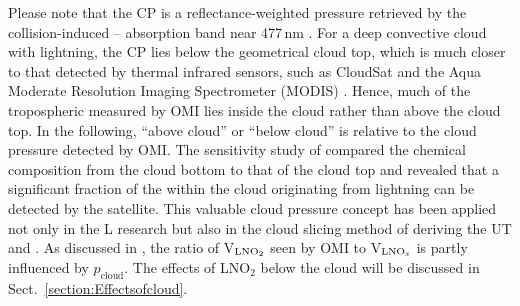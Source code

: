\documentclass[amt]{copernicus}
\begin{document}
Please note that the CP is a reflectance-weighted pressure retrieved by the collision-induced -- absorption band near 477\,nm \citep{Acarreta.2004,Sneep.2008,Stammes.2008}.
For a deep convective cloud with lightning, the CP lies below the geometrical cloud top, which is much closer to that detected by thermal infrared sensors, such as CloudSat and the Aqua Moderate Resolution Imaging Spectrometer (MODIS) \citep{Vasilkov.2008,Joiner.2012}.
Hence, much of the tropospheric  measured by OMI lies inside the cloud rather than above the cloud top.
In the following, ``above cloud'' or ``below cloud'' is relative to the cloud pressure detected by OMI.
The sensitivity study of \citet{Beirle.2009} compared the chemical composition from the cloud bottom to that of the cloud top and revealed that a significant fraction of the  within the cloud originating from lightning can be detected by the satellite.
This valuable cloud pressure concept has been applied not only in the L research but also in the cloud slicing method of deriving the UT  and  \citep{Ziemke.2009,Ziemke.2017,Choi.2014,Strode.2017,Marais.2018}.
As discussed in \citet{Pickering.2016}, the ratio of V$_\chem{LNO_2}$ seen by OMI to V$_\chem{LNO_\mathit{x}}$ is partly influenced by $p_\mathrm{cloud}$.
The effects of LNO$_2$ below the cloud will be discussed in Sect.~\ref{section:Effectsofcloud}.
\end{document}
